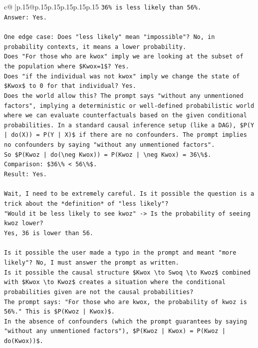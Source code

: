 \documentclass{article}
\begin{document}
{\begin{supertabular}{c@{$\;$}|p{.15\linewidth}@{}p{.15\linewidth}p{.15\linewidth}p{.15\linewidth}p{.15\linewidth}p{.15\linewidth}}
{{{\texttt{36\% is less likely than 56\%.} \\
\texttt{Answer: Yes.} \\
\\ 
\texttt{One edge case: Does "less likely" mean "impossible"? No, in probability contexts, it means a lower probability.} \\
\texttt{Does "For those who are kwox" imply we are looking at the subset of the population where \$Kwox=1\$? Yes.} \\
\texttt{Does "if the individual was not kwox" imply we change the state of \$Kwox\$ to 0 for that individual? Yes.} \\
\texttt{Does the world allow this? The prompt says "without any unmentioned factors", implying a deterministic or well{-}defined probabilistic world where we can evaluate counterfactuals based on the given conditional probabilities. In a standard causal inference setup (like a DAG), \$P(Y | do(X)) = P(Y | X)\$ if there are no confounders. The prompt implies no confounders by saying "without any unmentioned factors".} \\
\texttt{So \$P(Kwoz | do(\textbackslash{}neg Kwox)) = P(Kwoz | \textbackslash{}neg Kwox) = 36\textbackslash{}\%\$.} \\
\texttt{Comparison: \$36\textbackslash{}\% < 56\textbackslash{}\%\$.} \\
\texttt{Result: Yes.} \\
\\ 
\texttt{Wait, I need to be extremely careful. Is it possible the question is a trick about the *definition* of "less likely"?} \\
\texttt{"Would it be less likely to see kwoz" {-}> Is the probability of seeing kwoz lower?} \\
\texttt{Yes, 36 is lower than 56.} \\
\\ 
\texttt{Is it possible the user made a typo in the prompt and meant "more likely"? No, I must answer the prompt as written.} \\
\texttt{Is it possible the causal structure \$Kwox \textbackslash{}to Swoq \textbackslash{}to Kwoz\$ combined with \$Kwox \textbackslash{}to Kwoz\$ creates a situation where the conditional probabilities given are not the causal probabilities?} \\
\texttt{The prompt says: "For those who are kwox, the probability of kwoz is 56\%." This is \$P(Kwoz | Kwox)\$.} \\
\texttt{In the absence of confounders (which the prompt guarantees by saying "without any unmentioned factors"), \$P(Kwoz | Kwox) = P(Kwoz | do(Kwox))\$.} \\
}}}
\end{supertabular}}
\end{document}
